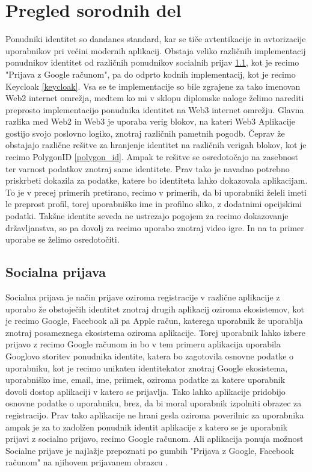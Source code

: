 \documentclass[a4paper,12pt,openright]{book}
\begin{document}
\section{Pregled sorodnih del}
Ponudniki identitet so dandanes standard, kar se tiče avtentikacije in avtorizacije uporabnikov pri večini modernih aplikacij.
Obstaja veliko različnih implementacij ponudnikov identitet od različnih ponudnikov socialnih prijav \ref{socialna_prijava}, kot je recimo "Prijava z Google računom", 
pa do odprto kodnih implementacij, kot je recimo Keycloak \ref{keycloak}.
Vsa se te implementacije so bile zgrajene za tako imenovan Web2 internet omrežja, medtem ko mi v sklopu diplomske naloge želimo 
narediti preprosto implementacijo ponudnika identitet na Web3 internet omrežju.
Glavna razlika med Web2 in Web3 je uporaba verig blokov, na kateri Web3 Aplikacije gostijo svojo poslovno logiko, znotraj različnih pametnih pogodb.
Čeprav že obstajajo različne rešitve za hranjenje identitet na različnih verigah blokov, kot je recimo PolygonID \ref{polygon_id}.
Ampak te rešitve se osredotočajo na zasebnost ter varnost podatkov znotraj same identitete.
Prav tako je navadno potrebno priskrbeti dokazila za podatke, katere bo identiteta lahko dokazovala aplikacijam.
To je v precej primerih pretirano, recimo v primerih, da bi uporabniki želeli imeti le preprost profil, torej uporabniško ime in profilno sliko, 
z dodatnimi opcijskimi podatki.
Takšne identite seveda ne ustrezajo pogojem za recimo dokazovanje državljanstva, so pa dovolj za recimo uporabo znotraj video igre.
In na ta primer uporabe se želimo osredotočiti.


\subsection{Socialna prijava} \label{socialna_prijava}
Socialna prijava je način prijave oziroma registracije v različne aplikacije z uporabo že obstoječih identitet znotraj drugih aplikacij oziroma ekosistemov, 
kot je recimo Google, Facebook ali pa Apple račun, katerega uporabnik že uporablja znotraj posameznega ekosistema oziroma aplikacije.
Torej uporabnik lahko izbere prijavo z recimo Google računom in bo v tem primeru aplikacija uporabila Googlovo storitev ponudnika identite,
katera bo zagotovila osnovne podatke o uporabniku, kot je recimo unikaten identitekator znotraj Google ekosistema, uporabniško ime, email, ime, priimek, 
oziroma podatke za katere uporabnik dovoli dostop aplikaciji v katero se prijavlja.
Tako lahko aplikacije pridobijo osnovne podatke o uporabniku, brez, da bi moral uporabnik izpolniti obrazec za registracijo.
Prav tako aplikacije ne hrani gesla oziroma poverilnic za uporabnika ampak je za to zadolžen ponudnik identit aplikacije z katero se je 
uporabnik prijavi z socialno prijavo, recimo Google računom.
Ali aplikacija ponuja možnost Socialne prijave je najlažje prepoznati po gumbih "Prijava z Google, Facebook računom" na njihovem prijavanem obrazcu \cite{social_login}.
\end{document}
